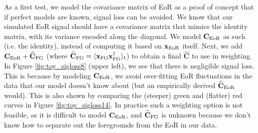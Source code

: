 \documentclass[preprint2,numberedappendix,tighten]{aastex6}
\begin{document}
As a first test, we model the covariance matrix of EoR as a proof of concept that if perfect models are known, signal loss can be 
avoided. We know that our simulated EoR signal should have a covariance matrix that mimics the identity matrix, with its 
variance encoded along the diagonal. We model $\textbf{C}_{\rm EoR}$ as such (i.e. the identity), instead of computing it based on $\textbf{x}
_{\rm EoR}$ itself. Next, we add $\textbf{C}_{\rm EoR} + \widehat{\textbf{C}}_{\rm FG}$ (where $\widehat{\textbf{C}}_{\rm FG} = \langle\textbf{x}_{\rm FG}
\textbf{x}_{\rm FG}^{\dagger}\rangle_{t}$) to obtain a final $\widehat{\textbf{C}}$ to use in weighting. In Figure \ref{fig:toy_sigloss8} (upper 
left), we see that there is negligible signal loss. This is because by modeling $\textbf{C}_{\rm EoR}$, we avoid over-fitting EoR fluctuations in the data that our model doesn't know about (but an empirically derived $\widehat{\textbf{C}}_{\rm EoR}$ would). This is also shown by comparing the (steeper) green and (flatter) red curves in Figure \ref{fig:toy_sigloss14}. In practice such a weighting option is not feasible, as it is difficult to model $\textbf{C}_{\rm EoR}$, and $\widehat{\textbf{C}}_{\rm FG}$ is unknown because we don't know how to separate out the foregrounds from the EoR in our data.
\end{document}
